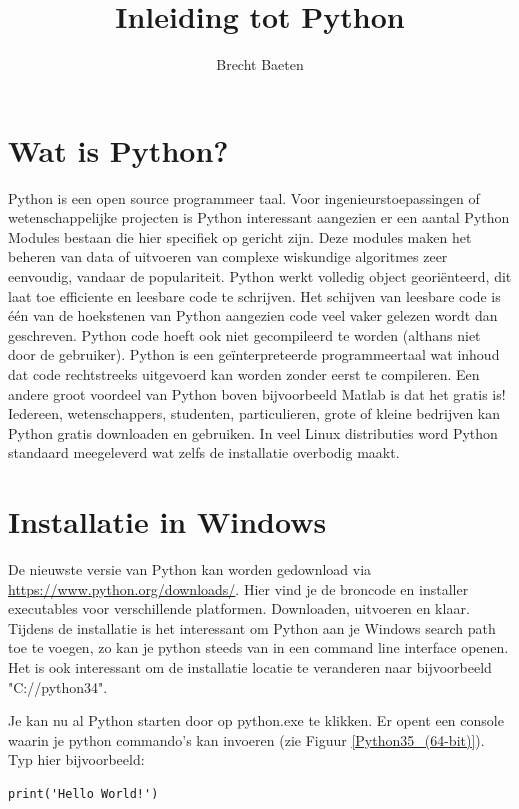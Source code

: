 \documentclass[11pt,twoside]{article}
\title{Inleiding tot Python}
\author{Brecht Baeten}
\begin{document}
	\maketitle

	\section{Wat is Python?}
Python is een open source programmeer taal. Voor ingenieurstoepassingen of wetenschappelijke projecten is Python interessant aangezien er een aantal Python Modules bestaan die hier specifiek op gericht zijn. Deze modules maken het beheren van data of uitvoeren van complexe wiskundige algoritmes zeer eenvoudig, vandaar de populariteit. Python werkt volledig object georiënteerd, dit laat toe efficiente en leesbare code te schrijven. Het schijven van leesbare code is één van de hoekstenen van Python aangezien code veel vaker gelezen wordt dan geschreven. Python code hoeft ook niet gecompileerd te worden (althans niet door de gebruiker). Python is een geïnterpreteerde programmeertaal wat inhoud dat code rechtstreeks uitgevoerd kan worden zonder eerst te compileren. Een andere groot voordeel van Python boven bijvoorbeeld Matlab is dat het gratis is! Iedereen, wetenschappers, studenten, particulieren, grote of kleine bedrijven kan Python gratis downloaden en gebruiken. In veel Linux distributies word Python standaard meegeleverd wat zelfs de installatie overbodig maakt.

	\section{Installatie in Windows}
De nieuwste versie van Python kan worden gedownload via \url{https://www.python.org/downloads/}. Hier vind je de broncode en installer executables voor verschillende platformen. Downloaden, uitvoeren en klaar. Tijdens de installatie is het interessant om Python aan je Windows search path toe te voegen, zo kan je python steeds van in een command line interface openen. Het is ook interessant om de installatie locatie te veranderen naar bijvoorbeeld  "\textsf{C://python34}".

Je kan nu al Python starten door op python.exe te klikken. Er opent een console waarin je python commando's kan invoeren (zie Figuur \ref{Python35_(64-bit)}). Typ hier bijvoorbeeld:
\begin{lstlisting}
print('Hello World!')
\end{lstlisting}
\end{document}
